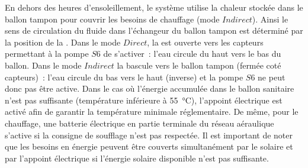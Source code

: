 En dehors des heures d’ensoleillement, le système utilise la chaleur stockée dans
le ballon tampon pour couvrir les besoins de chauffage (mode $Indirect$). Ainsi le sens de
circulation du fluide dans l’échangeur du ballon tampon est déterminé par la position de
la . Dans le mode $Direct$, la  est ouverte vers les capteurs permettant à la
pompe $S6$ de s’activer~: l’eau circule du haut vers le bas du ballon. Dans le mode
$Indirect$ la  bascule vers le ballon tampon (fermée coté capteurs)~: l’eau circule
du bas vers le haut (inverse) et la pompe $S6$ ne peut donc pas être active.
Dans le cas où l’énergie accumulée dans le ballon sanitaire n’est pas suffisante (température inférieure
à \SI{55}{\celsius}), l’appoint électrique est activé afin de garantir la température
minimale réglementaire. De même, pour le chauffage, une batterie électrique en partie
terminale du réseau aéraulique s’active si la consigne de soufflage n’est pas respectée.
Il est important de noter que les besoins en énergie peuvent être couverts simultanément
par le solaire et par l’appoint électrique si l’énergie solaire disponible n’est pas
suffisante.

